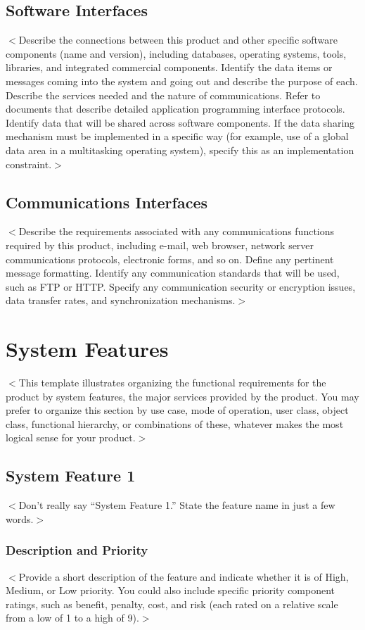 \documentclass{scrreprt}
\begin{document}
\section{Software Interfaces}
$<$Describe the connections between this product and other specific software 
components (name and version), including databases, operating systems, tools, 
libraries, and integrated commercial components. Identify the data items or 
messages coming into the system and going out and describe the purpose of each.  
Describe the services needed and the nature of communications. Refer to 
documents that describe detailed application programming interface protocols.  
Identify data that will be shared across software components. If the data 
sharing mechanism must be implemented in a specific way (for example, use of a 
global data area in a multitasking operating system), specify this as an 
implementation constraint.$>$

\section{Communications Interfaces}
$<$Describe the requirements associated with any communications functions 
required by this product, including e-mail, web browser, network server 
communications protocols, electronic forms, and so on. Define any pertinent 
message formatting. Identify any communication standards that will be used, such 
as FTP or HTTP. Specify any communication security or encryption issues, data 
transfer rates, and synchronization mechanisms.$>$


\chapter{System Features}
$<$This template illustrates organizing the functional requirements for the 
product by system features, the major services provided by the product. You may 
prefer to organize this section by use case, mode of operation, user class, 
object class, functional hierarchy, or combinations of these, whatever makes the 
most logical sense for your product.$>$

\section{System Feature 1}
$<$Don’t really say “System Feature 1.” State the feature name in just a few 
words.$>$

\subsection{Description and Priority}
$<$Provide a short description of the feature and indicate whether it is of 
High, Medium, or Low priority. You could also include specific priority 
component ratings, such as benefit, penalty, cost, and risk (each rated on a 
relative scale from a low of 1 to a high of 9).$>$
\end{document}

